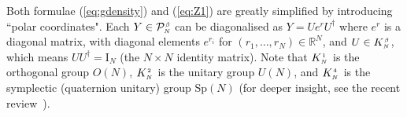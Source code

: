 \documentclass[draftclsnofoot]{IEEEtran}
\begin{document}
Both formulae (\ref{eq:gdensity}) and (\ref{eq:Z1}) are greatly simplified by introducing ``polar coordinates". Each $Y \in \mathcal{P}^{\hspace{0.02cm}\scriptscriptstyle \beta}_{\scriptscriptstyle N}$ can be diagonalised as $Y = U e^r U^\dagger$ where $e^r$ is a diagonal matrix, with diagonal elements $e^{r_i}$ for $(r_{\scriptscriptstyle 1},\ldots,r_{\scriptscriptstyle N}) \in \mathbb{R}^N$, and $U \in K^{\hspace{0.02cm}\scriptscriptstyle \beta}_{\scriptscriptstyle N\hspace{0.02cm}}$, which means $UU^\dagger = \mathrm{I}_{\scriptscriptstyle N}$ (the $N \times N$ identity matrix). Note that $K^{\hspace{0.02cm}\scriptscriptstyle 1}_{\scriptscriptstyle N\hspace{0.02cm}}$ is the orthogonal group $O(N)$, $K^{\hspace{0.02cm}\scriptscriptstyle 2}_{\scriptscriptstyle N\hspace{0.02cm}}$ is the unitary group $U(N)$, and $K^{\hspace{0.02cm}\scriptscriptstyle 4}_{\scriptscriptstyle N\hspace{0.02cm}}$ is the symplectic (quaternion unitary) group $\mathrm{Sp}(N)$ (for deeper insight, see the recent review~\cite{edelman}). 
\end{document}
